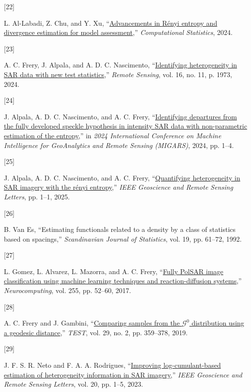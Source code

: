 \documentclass[
  lettersize  journal,
]{IEEEtran}%
\newlength{\cslhangindent}
\newlength{\csllabelwidth}
\newenvironment{CSLReferences}[2] %
 {\begin{list}{}{%
  \setlength{\itemindent}{0pt}
  \setlength{\leftmargin}{0pt}
  \setlength{\parsep}{0pt}
  \ifodd #1
   \setlength{\leftmargin}{\cslhangindent}
   \setlength{\itemindent}{-1\cslhangindent}
  \fi
  \setlength{\itemsep}{#2\baselineskip}}}
 {\end{list}}
\newcommand{\CSLLeftMargin}[1]{\parbox[t]{\csllabelwidth}{\strut#1\strut}}
\newcommand{\CSLRightInline}[1]{\parbox[t]{\linewidth - \csllabelwidth}{\strut#1\strut}}
\begin{document}
\begin{CSLReferences}{0}{0}
\CSLLeftMargin{{[}22{]} }%
\CSLRightInline{L. Al-Labadi, Z. Chu, and Y. Xu,
{``\href{https://doi.org/10.1007/s00180-024-01507-z}{Advancements in
{R}ényi entropy and divergence estimation for model assessment},''}
\emph{Computational Statistics}, 2024. }

\CSLLeftMargin{{[}23{]} }%
\CSLRightInline{A. C. Frery, J. Alpala, and A. D. C. Nascimento,
{``\href{https://doi.org/10.3390/rs16111973}{Identifying heterogeneity
in {SAR} data with new test statistics},''} \emph{Remote Sensing}, vol.
16, no. 11, p. 1973, 2024. }

\CSLLeftMargin{{[}24{]} }%
\CSLRightInline{J. Alpala, A. D. C. Nascimento, and A. C. Frery,
{``\href{https://doi.org/10.1109/migars61408.2024.10544448}{Identifying
departures from the fully developed speckle hypothesis in intensity
{SAR} data with non-parametric estimation of the entropy},''} in
\emph{2024 {I}nternational {C}onference on {M}achine {I}ntelligence for
{G}eo{A}nalytics and {R}emote {S}ensing ({MIGARS})}, 2024, pp. 1--4. }

\CSLLeftMargin{{[}25{]} }%
\CSLRightInline{J. Alpala, A. D. C. Nascimento, and A. C. Frery,
{``\href{https://doi.org/10.1109/lgrs.2025.3581855}{Quantifying
heterogeneity in SAR imagery with the rényi entropy},''} \emph{IEEE
Geoscience and Remote Sensing Letters}, pp. 1--1, 2025. }

\CSLLeftMargin{{[}26{]} }%
\CSLRightInline{B. Van Es, {``Estimating functionals related to a
density by a class of statistics based on spacings,''}
\emph{Scandinavian Journal of Statistics}, vol. 19, pp. 61--72, 1992. }

\CSLLeftMargin{{[}27{]} }%
\CSLRightInline{L. Gomez, L. Alvarez, L. Mazorra, and A. C. Frery,
{``\href{https://doi.org/10.1016/j.neucom.2016.08.140}{Fully PolSAR
image classification using machine learning techniques and
reaction-diffusion systems},''} \emph{Neurocomputing}, vol. 255, pp.
52--60, 2017. }

\CSLLeftMargin{{[}28{]} }%
\CSLRightInline{A. C. Frery and J. Gambini,
{``\href{https://doi.org/10.1007/s11749-019-00658-2}{Comparing samples
from the \({\mathcal {G}}^0\) distribution using a geodesic
distance},''} \emph{TEST}, vol. 29, no. 2, pp. 359--378, 2019. }

\CSLLeftMargin{{[}29{]} }%
\CSLRightInline{J. F. S. R. Neto and F. A. A. Rodrigues,
{``\href{https://doi.org/10.1109/lgrs.2023.3305119}{Improving
log-cumulant-based estimation of heterogeneity information in {SAR}
imagery},''} \emph{{IEEE} Geoscience and Remote Sensing Letters}, vol.
20, pp. 1--5, 2023. }

\end{CSLReferences}
\end{document}

